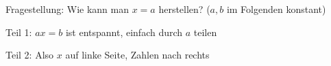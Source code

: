 \documentclass[../../main.tex]{subfiles}
\begin{document}
Fragestellung: Wie kann man $x=a$ herstellen? ($a,b$ im Folgenden konstant)

Teil 1: $ax=b$ ist entspannt, einfach durch $a$ teilen

Teil 2: Also $x$ auf linke Seite, Zahlen nach rechts
\end{document}
